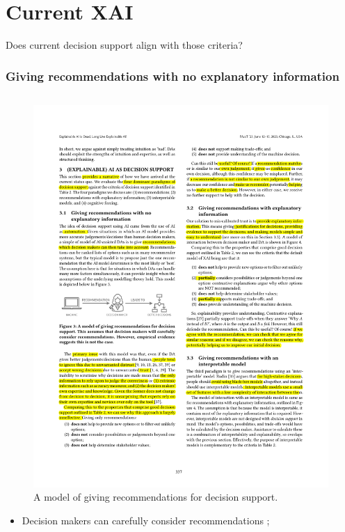 \documentclass[compress,12pt]{beamer}
\begin{document}
\section{Current XAI}

\begin{frame}[standout]
      \centering\large
      Does current decision support align with those criteria?
\end{frame}

\begin{frame}
      \frametitle{Giving recommendations with no explanatory information}
      \begin{columns}[T] %
            \begin{column}{.75\textwidth}
                  \begin{figure}[htbp]
                        \centering
                        \includegraphics[width=.9\textwidth]{fig3.pdf}
                        \caption{ A model of giving recommendations for decision support.}
                  \end{figure}
                  \begin{itemize}
                        \item [] Decision makers can carefully consider recommendations ;

\end{itemize}
\end{column}
\end{columns}
\end{frame}
\end{document}

